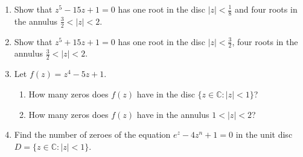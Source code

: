 \documentclass[a4paper,10pt]{article}
\begin{document}
\begin{enumerate}
	\item Show that $z^{5}-15z+1=0$ has one root in the disc $|z|<\frac{1}{8}$ and four roots in the annulus $\frac{3}{2}<|z|<2$.
	
	\item Show that $z^{5}+15z+1=0$ has one root in the disc $|z|<\frac{3}{2}$, four roots in the annulus $\frac{3}{2}<|z|<2$.
	
	\item Let $f(z)=z^{4}-5z+1$.
	\begin{enumerate}
		\item How many zeros does $f(z)$ have in the disc $\{z\in \mathbb{C}:|z|<1\}$?
		\item How many zeros does $f(z)$ have in the annulus $1<|z|<2$?
	\end{enumerate}
	
	\item Find the number of zeroes of the equation $e^{z}-4z^{n}+1=0$ in the unit disc $D=\{z\in \mathbb{C}:|z|<1\}$.
	
\end{enumerate}
\end{document}
